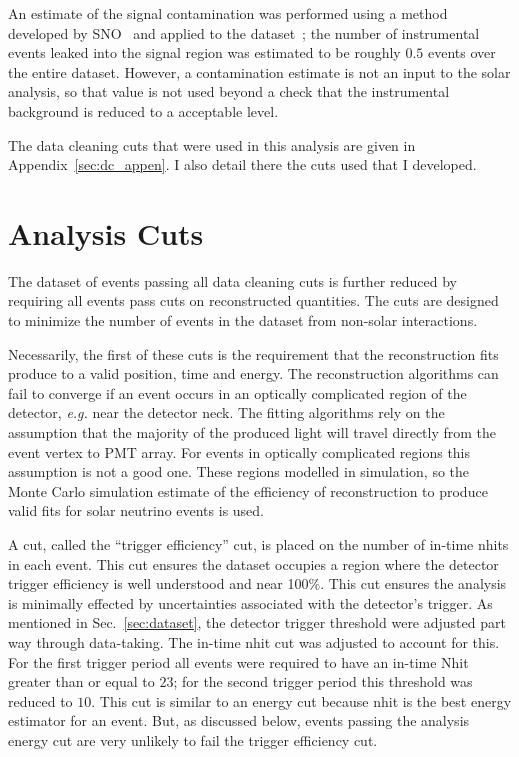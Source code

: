 An estimate of the signal contamination was performed using a method developed
by SNO~\citep{neil_thesis} and applied to the dataset~\citep{dc_document};
the number of instrumental events leaked into the signal region was estimated
to be roughly $0.5$ events over the entire dataset.
However, a contamination estimate is not an input to the solar analysis,
so that value is not used beyond a check that the instrumental background
is reduced to a acceptable level.

The data cleaning cuts that were used in this analysis are given in Appendix~\ref{sec:dc_appen}.
I also detail there the cuts used that I developed.


\section{Analysis Cuts}
\label{sec:analysis_cuts}
The dataset of events passing all data cleaning cuts is further reduced by
requiring all events pass cuts on reconstructed quantities.
The cuts are designed to minimize the number of events in the dataset from
non-solar interactions.

Necessarily, the first of these cuts is the requirement that the reconstruction
fits produce to a valid position, time and energy.
The reconstruction algorithms can fail to converge if an event occurs in an
optically complicated region of the detector, \textit{e.g.} near the detector
neck. The fitting algorithms rely on the assumption that the majority of
the produced light will travel directly from the event vertex to PMT array.
For events in optically complicated regions this assumption is not a good one.
These regions modelled in simulation, so the Monte Carlo simulation estimate of
the efficiency of reconstruction to produce valid fits for solar neutrino events
is used.

A cut, called the ``trigger efficiency'' cut,  is placed on the number of
in-time nhits in each event.
This cut ensures the dataset occupies a region where the detector trigger
efficiency is well understood and near 100\%.
This cut ensures the analysis is minimally effected by uncertainties
associated with the detector's trigger.
As mentioned in Sec.~\ref{sec:dataset}, the detector trigger threshold were adjusted
part way through data-taking. The in-time nhit cut was adjusted to
account for this.
For the first trigger period all events were required to have an in-time
Nhit greater than or equal to $23$; for the second trigger period this
threshold was reduced to $10$.
This cut is similar to an energy cut because nhit is the best energy estimator
for an event. But, as discussed below, events passing the analysis energy cut
are very unlikely to fail the trigger efficiency cut.

